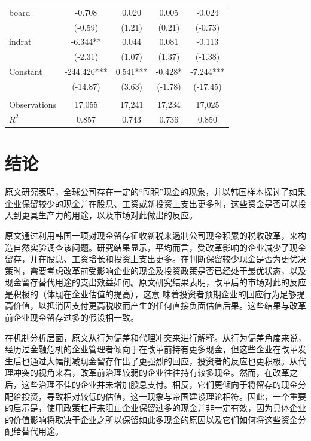 \documentclass{article}
\begin{document}
\begin{table}[H]
\begin{tabular}{lcccc}
    board        & -0.708      & 0.020     & 0.005     & -0.024    \\
                 & (-0.59)     & (1.21)    & (0.21)    & (-0.73)   \\
    indrat       & -6.344**    & 0.044     & 0.081     & -0.113    \\
                 & (-2.31)     & (1.07)    & (1.37)    & (-1.38)   \\
    Constant     & -244.420*** & 0.541***  & -0.428*   & -7.244*** \\
                 & (-14.87)    & (3.63)    & (-1.78)   & (-17.45)  \\
                 &             &           &           &           \\
    Observations & 17,055      & 17,241    & 17,234    & 17,025    \\
    $R^2$    & 0.857       & 0.743     & 0.736     & 0.850     \\ \bottomrule
    \end{tabular}
\end{table}

\section{结论}
原文研究表明，全球公司存在一定的“囤积”现金的现象，并以韩国样本探讨了如果企业保留较少的现金并在股息、工资或新投资上支出更多时，这些资金是否可以投入到更具生产力的用途，以及市场对此做出的反应。

原文通过利用韩国一项对现金留存征收新税来遏制公司现金积累的税收改革，来构造自然实验调查该问题。研究结果显示，平均而言，受改革影响的企业减少了现金留存，并在股息、工资增长和投资上支出更多。在判断保留较少现金是否为更优决策时，需要考虑改革前受影响企业的现金及投资政策是否已经处于最优状态，以及现金留存替代用途的支出效益如何。原文研究结果表明，改革后的市场对此的反应是积极的（体现在企业估值的提高），这意 味着投资者预期企业的回应行为足够提高价值，以抵消因支付更高税收而产生的任何直接负面估值后果。这些结果与改革前企业现金留存过多的假设相一致。

在机制分析层面，原文从行为偏差和代理冲突来进行解释。从行为偏差角度来说，经历过金融危机的企业管理者倾向于在改革前持有更多现金，但这些企业在改革发生后也通过大幅削减现金留存作出了更强烈的回应，投资者的反应也更积极。从代理冲突的视角来看，改革前治理较弱的企业往往持有较多现金。然而，在改革之后，这些治理不佳的企业并未增加股息支付。相反，它们更倾向于将留存的现金分配给投资，导致相对较低的估值，这一现象与帝国建设理论相符。因此，一个重要的启示是，使用政策杠杆来阻止企业保留过多的现金并非一定有效，因为具体企业的价值影响将取决于企业之所以保留如此多现金的原因以及它们如何将这些资金分配给替代用途。
\end{document}
